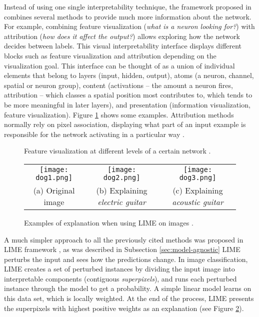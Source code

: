 \documentclass[final]{elsarticle}
\begin{document}
Instead of using one single interpretability technique, the framework proposed in \cite{Olah18} combines several methods to provide much more information  about the network. For example, combining feature visualization (\textit{what is a neuron looking for?}) with attribution (\textit{how does it affect the output?}) allows exploring how the network decides between labels. This visual interpretability interface displays different blocks such as feature visualization and attribution depending on the visualization goal. This interface can be thought of as a union of individual elements that belong to layers (input, hidden, output), atoms (a neuron, channel, spatial or neuron group), content (activations -- the amount a neuron fires, attribution -- which classes a spatial position most contributes to, which tends to be more meaningful in later layers), and presentation (information visualization, feature visualization). Figure \ref{fig:feature} shows some examples. Attribution methods normally rely on pixel association, displaying what part of an input example is responsible for the network activating in a particular way \cite{Olah17}. 
\begin{figure}[htbp!]
\centering
{}
  \caption{Feature visualization at different levels of a certain network \cite{Olah17}.\label{fig:feature}}
\end{figure}

\begin{figure}[htbp!]
\centering
  \begin{tabular}{c@{\qquad}c@{\qquad}c}
\texttt{[image: dog1.png]}  & 
\texttt{[image: dog2.png]} & 
\texttt{[image: dog3.png]} \\ 
(a) Original image & (b) Explaining \textit{electric guitar} & (c) Explaining \textit{acoustic guitar} 
  \end{tabular} 
  \caption{Examples of explanation when using LIME on images \cite{LIME}.\label{fig:lime}}
\end{figure}

A much simpler approach to all the previously cited methods was proposed in LIME framework \cite{LIME}, as was described in Subsection \ref{sec:model-agnostic} LIME perturbs the input and sees how the predictions change. In image classification, LIME creates a set of perturbed instances by dividing the input image into interpretable components (contiguous \textit{superpixels}), and runs each perturbed instance through the model to get a probability. A simple linear model learns on this data set, which is locally weighted. At the end of the process, LIME presents the superpixels with highest positive weights as an explanation (see Figure \ref{fig:lime}).
\end{document}

